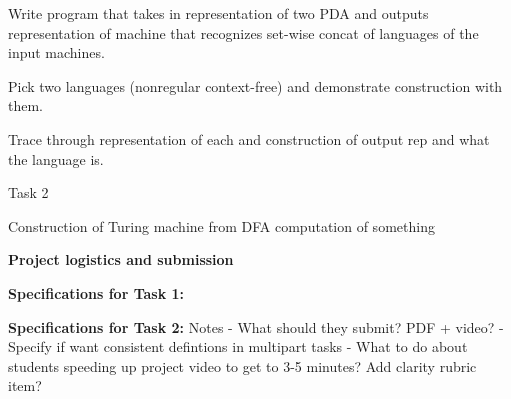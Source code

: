Write program that takes in representation of two PDA and outputs representation 
of machine that recognizes set-wise concat of languages of the input machines.

Pick two languages (nonregular context-free) and demonstrate construction with them.

Trace through representation of each and construction of output rep and what the language is.


Task 2

Construction of Turing machine from DFA computation of something


{\bf Project logistics and submission}

{\bf Specifications for Task 1:}

{\bf Specifications for Task 2:}
Notes
- What should they submit? PDF + video? 
- Specify if want consistent defintions in multipart tasks
- What to do about students speeding up project video to get to 3-5 minutes? Add clarity rubric item?

\newpage

